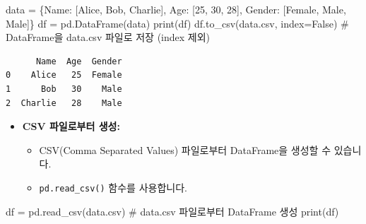 \documentclass[
  letterpaper,
]{book}
\newenvironment{Shaded}{\begin{snugshade}}{\end{snugshade}}
\newcommand{\BuiltInTok}[1]{\textcolor[rgb]{0.00,0.23,0.31}{#1}}
\newcommand{\CommentTok}[1]{\textcolor[rgb]{0.37,0.37,0.37}{#1}}
\newcommand{\DecValTok}[1]{\textcolor[rgb]{0.68,0.00,0.00}{#1}}
\newcommand{\NormalTok}[1]{\textcolor[rgb]{0.00,0.23,0.31}{#1}}
\newcommand{\OperatorTok}[1]{\textcolor[rgb]{0.37,0.37,0.37}{#1}}
\newcommand{\StringTok}[1]{\textcolor[rgb]{0.13,0.47,0.30}{#1}}
\newcommand{\VariableTok}[1]{\textcolor[rgb]{0.07,0.07,0.07}{#1}}
\providecommand{\tightlist}{%
  \setlength{\itemsep}{0pt}\setlength{\parskip}{0pt}}
\begin{document}
\begin{Shaded}
\begin{Highlighting}[]
\NormalTok{    data }\OperatorTok{=}\NormalTok{ \{}\StringTok{\textquotesingle{}Name\textquotesingle{}}\NormalTok{: [}\StringTok{\textquotesingle{}Alice\textquotesingle{}}\NormalTok{, }\StringTok{\textquotesingle{}Bob\textquotesingle{}}\NormalTok{, }\StringTok{\textquotesingle{}Charlie\textquotesingle{}}\NormalTok{], }\StringTok{\textquotesingle{}Age\textquotesingle{}}\NormalTok{: [}\DecValTok{25}\NormalTok{, }\DecValTok{30}\NormalTok{, }\DecValTok{28}\NormalTok{], }\StringTok{\textquotesingle{}Gender\textquotesingle{}}\NormalTok{: [}\StringTok{\textquotesingle{}Female\textquotesingle{}}\NormalTok{, }\StringTok{\textquotesingle{}Male\textquotesingle{}}\NormalTok{, }\StringTok{\textquotesingle{}Male\textquotesingle{}}\NormalTok{]\}}
\NormalTok{    df }\OperatorTok{=}\NormalTok{ pd.DataFrame(data)}
    \BuiltInTok{print}\NormalTok{(df)}
\NormalTok{    df.to\_csv(}\StringTok{\textquotesingle{}data.csv\textquotesingle{}}\NormalTok{, index}\OperatorTok{=}\VariableTok{False}\NormalTok{) }\CommentTok{\# DataFrame을 data.csv 파일로 저장 (index 제외)}
\end{Highlighting}
\end{Shaded}

\begin{verbatim}
      Name  Age  Gender
0    Alice   25  Female
1      Bob   30    Male
2  Charlie   28    Male
\end{verbatim}

\begin{itemize}
\item
  \textbf{CSV 파일로부터 생성:}

  \begin{itemize}
  \tightlist
  \item
    CSV(Comma Separated Values) 파일로부터 DataFrame을 생성할 수
    있습니다.
  \item
    \texttt{pd.read\_csv()} 함수를 사용합니다.
  \end{itemize}
\end{itemize}

\begin{Shaded}
\begin{Highlighting}[]
\NormalTok{    df }\OperatorTok{=}\NormalTok{ pd.read\_csv(}\StringTok{\textquotesingle{}data.csv\textquotesingle{}}\NormalTok{) }\CommentTok{\# data.csv 파일로부터 DataFrame 생성}
    \BuiltInTok{print}\NormalTok{(df)}
\end{Highlighting}
\end{Shaded}
\end{document}
